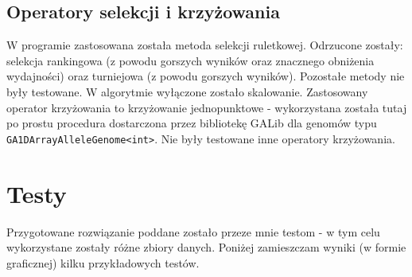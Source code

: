 \documentclass[11pt,a4paper,oneside]{article}
\begin{document}
\subsection{Operatory selekcji i krzyżowania}
W programie zastosowana została metoda selekcji ruletkowej. Odrzucone zostały: selekcja rankingowa (z powodu gorszych wyników oraz znacznego obniżenia wydajności) oraz turniejowa (z powodu gorszych wyników). Pozostałe metody nie były testowane. W algorytmie wyłączone zostało skalowanie. Zastosowany operator krzyżowania to krzyżowanie jednopunktowe - wykorzystana została tutaj po prostu procedura dostarczona przez bibliotekę GALib dla genomów typu \lstinline{GA1DArrayAlleleGenome<int>}. Nie były testowane inne operatory krzyżowania.

\section{Testy}
Przygotowane rozwiązanie poddane zostało przeze mnie testom - w tym celu wykorzystane zostały różne zbiory danych. Poniżej zamieszczam wyniki (w formie graficznej) kilku przykładowych testów.
\end{document}
